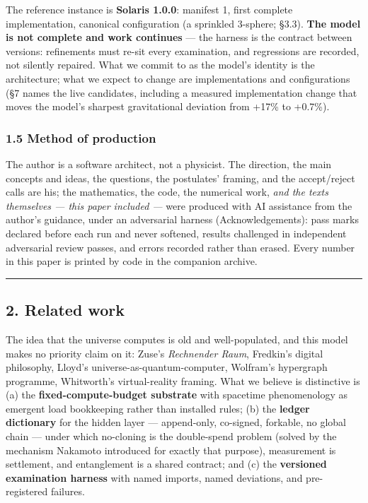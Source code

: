 \documentclass[
  11pt,
]{article}
\begin{document}
The reference instance is \textbf{Solaris 1.0.0}: manifest 1, first
complete implementation, canonical configuration (a sprinkled 3-sphere;
\S{}3.3). \textbf{The model is not complete and work continues} --- the
harness is the contract between versions: refinements must re-sit every
examination, and regressions are recorded, not silently repaired. What
we commit to as the model's identity is the architecture; what we expect
to change are implementations and configurations (\S{}7 names the live
candidates, including a measured implementation change that moves the
model's sharpest gravitational deviation from +17\% to +0.7\%).

\subsubsection{1.5 Method of production}\label{method-of-production}

The author is a software architect, not a physicist. The direction, the
main concepts and ideas, the questions, the postulates' framing, and the
accept/reject calls are his; the mathematics, the code, the numerical
work, \emph{and the texts themselves --- this paper included ---} were
produced with AI assistance from the author's guidance, under an
adversarial harness (Acknowledgements): pass marks declared before each
run and never softened, results challenged in independent adversarial
review passes, and errors recorded rather than erased. Every number in
this paper is printed by code in the companion archive.

\begin{center}\rule{0.5\linewidth}{0.5pt}\end{center}

\subsection{2. Related work}\label{related-work}

The idea that the universe computes is old and well-populated, and this
model makes no priority claim on it: Zuse's \emph{Rechnender Raum},
Fredkin's digital philosophy, Lloyd's universe-as-quantum-computer,
Wolfram's hypergraph programme, Whitworth's virtual-reality framing.
What we believe is distinctive is (a) the \textbf{fixed-compute-budget
substrate} with spacetime phenomenology as emergent load bookkeeping
rather than installed rules; (b) the \textbf{ledger dictionary} for the
hidden layer --- append-only, co-signed, forkable, no global chain ---
under which no-cloning is the double-spend problem (solved by the
mechanism Nakamoto introduced for exactly that purpose), measurement is
settlement, and entanglement is a shared contract; and (c) the
\textbf{versioned examination harness} with named imports, named
deviations, and pre-registered failures.
\end{document}
